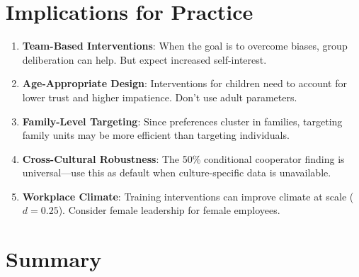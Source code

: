 \section{Implications for Practice}
\label{sec:su-practice}

\begin{tcolorbox}[colback=green!5!white, colframe=green!75!black,
    title=Practical Implications]
\begin{enumerate}
\item \textbf{Team-Based Interventions}: When the goal is to overcome biases, group deliberation can help. But expect increased self-interest.

\item \textbf{Age-Appropriate Design}: Interventions for children need to account for lower trust and higher impatience. Don't use adult parameters.

\item \textbf{Family-Level Targeting}: Since preferences cluster in families, targeting family units may be more efficient than targeting individuals.

\item \textbf{Cross-Cultural Robustness}: The 50\% conditional cooperator finding is universal---use this as default when culture-specific data is unavailable.

\item \textbf{Workplace Climate}: Training interventions can improve climate at scale ($d = 0.25$). Consider female leadership for female employees.
\end{enumerate}
\end{tcolorbox}


\section{Summary}
\label{sec:su-summary}


